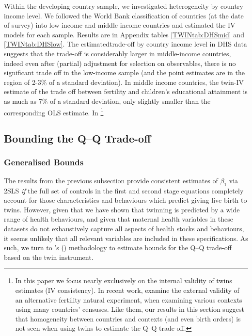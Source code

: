 \documentclass[subeqn]{article}
\begin{document}
\begin{spacing}{1.4}
Within the developing country sample, we investigated heterogeneity by country income level.
We followed the World Bank classification of countries (at the date of survey) into low income and middle income countries and estimated the IV models for each sample. Results are in Appendix
tables \ref{TWINtab:DHSmid} and \ref{TWINtab:DHSlow}. The estimatedtrade-off by country income level in DHS data suggests that the
trade-off is considerably larger in middle-income countries, indeed even after (partial) adjustment for selection on observables, there is no significant trade off in the low-income sample (and the point estimates are in the region of 2-3\% of a standard deviation). In middle income countries, the twin-IV estimate of the trade off between fertility and children's educational attainment is as much as 7\% of a standard deviation, only slightly smaller than the corresponding OLS estimate. In
\footnote{In this paper we focus nearly exclusively on the internal validity
  of twins estimates (IV consistency).  In recent work, \citet{Deheijaetal2015}
  examine the external validity of an alternative fertility natural experiment,
  when examining various contexts using many countries' censuses.  Like them,
  our results in this section suggest that homogeneity between countries and
  contexts (and even birth orders) is not seen when using twins to estimate the
  Q--Q trade-off.} 



\subsection{Bounding the Q--Q Trade-off}           \label{TWINsscn:resultBounds}
\subsubsection{Generalised Bounds}
The results from the previous subsection provide consistent estimates of 
$\beta_1$ via 2SLS \emph{if} the full set of controls in the first and second 
stage equations completely account for those characteristics and behaviours 
which predict giving live birth to twins. However, given that we have shown that 
twinning is predicted by a wide range of health behaviours, and given that 
maternal health variables in these datasets do not exhaustively capture all 
aspects of health stocks and behaviours, it seems unlikely that all relevant 
variables are included in these specifications. As such, we turn to 
\citeauthor{Conleyetal2012}'s (\citeyear{Conleyetal2012}) methodology to
estimate bounds for the Q--Q trade-off based on the twin instrument.


\end{spacing}
\end{document}

